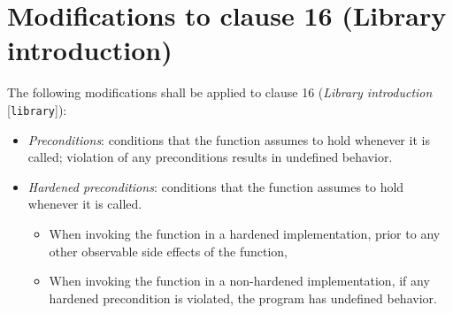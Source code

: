 \section{Modifications to clause 16 (Library introduction)}

The following modifications shall be applied to clause 16 (\emph{Library
introduction} [\texttt{library}]):

\begin{modification}
\begin{itemize}[label=\textemdash]

\item
\emph{Preconditions}: conditions that the function assumes to hold whenever it is called; violation of any
preconditions results in undefined behavior.
\newline

\end{itemize}
\end{modification}

\begin{modification}

\begin{itemize}[label=\textemdash]

\item
\emph{Hardened preconditions}: conditions that the function assumes to hold whenever it is called.

\begin{itemize}[label=\textemdash]

\item
When invoking the function in a hardened implementation, prior to any other observable side
effects of the function, 

\item
When invoking the function in a non-hardened implementation, if any hardened precondition is
violated, the program has undefined behavior.

\end{itemize}

\end{itemize}

\end{modification}


